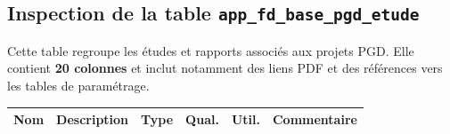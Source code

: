 \subsection{Inspection de la table \texttt{app\_fd\_base\_pgd\_etude}}

Cette table regroupe les études et rapports associés aux projets
PGD. Elle contient \textbf{20 colonnes} et inclut notamment
des liens PDF et des références vers les tables de paramétrage.

\begin{longtable}{
  | >{\RaggedRight}p{3cm}
  | >{\RaggedRight}p{3.2cm}
  | >{\centering\arraybackslash}p{1.2cm}
  | >{\centering\arraybackslash}p{0.9cm}
  | >{\centering\arraybackslash}p{0.8cm}
  | >{\RaggedRight}p{3.8cm} |
}
\hline
\textbf{Nom} & \textbf{Description} & \textbf{Type} &
\textbf{Qual.} & \textbf{Util.} & \textbf{Commentaire} \\
\hline
\endhead


\end{longtable}
